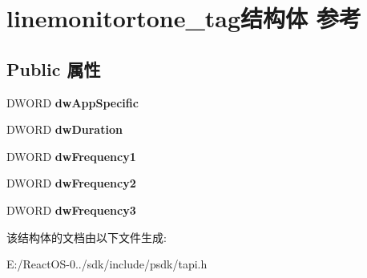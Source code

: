 \hypertarget{structlinemonitortone__tag}{}\section{linemonitortone\+\_\+tag结构体 参考}
\label{structlinemonitortone__tag}
\subsection*{Public 属性}
\begin{DoxyCompactItemize}
\item 
\mbox{\label{structlinemonitortone__tag_a196549a1e8a8ce6038770b68a5e6b4c0}} 
D\+W\+O\+RD {\bfseries dw\+App\+Specific}
\item 
\mbox{\label{structlinemonitortone__tag_a961601b5121f61ead875d775d013d74e}} 
D\+W\+O\+RD {\bfseries dw\+Duration}
\item 
\mbox{\label{structlinemonitortone__tag_aec974db5498a34c0a9b224298c3acf91}} 
D\+W\+O\+RD {\bfseries dw\+Frequency1}
\item 
\mbox{\label{structlinemonitortone__tag_aa5e3d52b312eb46d8473839a791c10f7}} 
D\+W\+O\+RD {\bfseries dw\+Frequency2}
\item 
\mbox{\label{structlinemonitortone__tag_ac9c5b2e998e0c560434fe94174fca902}} 
D\+W\+O\+RD {\bfseries dw\+Frequency3}
\end{DoxyCompactItemize}


该结构体的文档由以下文件生成\+:\begin{DoxyCompactItemize}
\item 
E\+:/\+React\+O\+S-\/0../sdk/include/psdk/tapi.\+h\end{DoxyCompactItemize}
